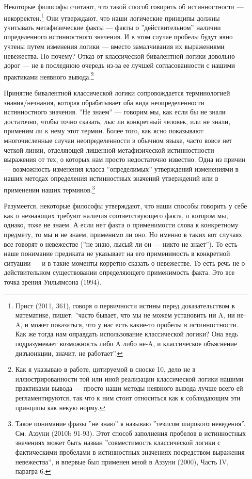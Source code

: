 \documentclass[11pt]{book}
\begin{document}
Некоторые философы считают, что такой способ говорить об истинностности --- некорректен.\footnote{Прист (2011, 361), говоря о первичности истины перед доказательством в математике, пишет: ''часто бывает, что мы не можем установить ни A, ни не-A, и может показаться, что у нас есть какие-то пробелы в истинностности. Как же тогда нам оправдать использование классической логики? Она ведь подразумевает возможность либо A либо не-A, и классическое объяснение дизъюнкции, значит, не работает''.} Они утверждают, что наши логические принципы должны учитывать метафизические факты --- факты о ''действительном'' наличии определенного истинностного значения. И в этом случае пробелы будут явно учтены путем изменения логики --- вместо замалчивания их выражениями невежества. Но почему? Отказ от классической бивалентной логики довольно дорог --- не в последнюю очередь из-за ее лучшей согласованности с нашими практиками неявного вывода.\footnote{Как я указываю в работе, цитируемой в сноске 10, дело не в иллюстрированности той или иной реализации классической логики нашими практиками вывода --- просто наши методы неявного вывода лучше всего ей регламентируются, так что к ним стоит относиться как к соблюдающим эти принципы как некую норму.}

Принятие бивалентной классической логики сопровождается терминологией знания/незнания, которая обрабатывает оба вида неопределенности истинностного значения. ''Не знаем'' --- говорим мы, как если бы не знали достаточно, чтобы точно сказать, лыс ли конкретный человек, или не знали, применим ли к нему этот термин. Более того, как ясно показывают многочисленные случаи неопределенности в обычном языке, часто вовсе нет четкой линии, отделяющей лишенной метафизической истинностности выражения от тех, о которых нам просто недостаточно известно. Одна из причин --- возможность изменения класса ''определимых'' утверждений изменениями в наших методах определения истинностных значений утверждений или в применении наших терминов.\footnote{Такое понимание фразы ''не знаю'' я называю ''тезисом широкого неведения''. См. Аззуни (2010b 91-93). Этот способ заполнения пробелов в истинностных значениях может быть назван ''совместимость классической логики с фактическими пробелами в истинностных значениях посредством выражения невежества'', и впервые был применен мной в Аззуни (2000), Часть IV, парагра 6.}

Разумеется, некоторые философы утверждают, что наши способы говорить у себе как о незнающих требуют наличия соответствующего факта, о котором мы, однако, тоже не знаем. А если нет факта о применимости слова к конкретному предмету, то мы и не знаем, применимо ли оно. Но именно в таких вот случаях все говорят о невежестве (''не знаю, лысый ли он --- никто не знает''). То есть наше понимание предиката не указывает на его применимость в конкретной ситуации --- и в такие моменты корретно сказать о невежестве. То есть речь не о действительном существовании определяющего применимость факта. Это все точка зрения Уильямсона (1994).
\end{document}
